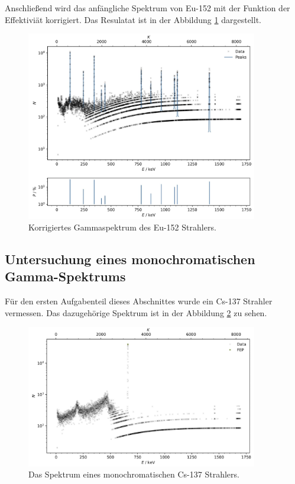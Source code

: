 Anschließend wird das anfängliche Spektrum von Eu-152 mit der Funktion der Effektiviät korrigiert.
Das Resulatat ist in der Abbildung \ref{fig:plot6} dargestellt.

\begin{figure}[H]
    \centering
    \includegraphics[width=0.9\textwidth]{content/plots/plot6.jpg}
   \caption{Korrigiertes Gammaspektrum des Eu-152 Strahlers.}
    \label{fig:plot6}
\end{figure}

\subsection{Untersuchung eines monochromatischen Gamma-Spektrums}
\label{sec:untersuchung gamma spektrum}

Für den ersten Aufgabenteil dieses Abschnittes wurde ein Cs-137 Strahler vermessen.
Das dazugehörige Spektrum ist in der Abbildung \ref{fig:plot7} zu sehen.

\begin{figure}[H]
    \centering
    \includegraphics[width=0.9\textwidth]{content/plots/plot7.jpg}
    \caption{Das Spektrum eines monochromatischen Cs-137 Strahlers.}
    \label{fig:plot7}
\end{figure}

